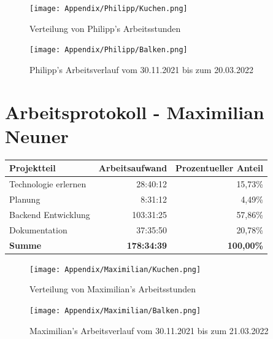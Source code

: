 \begin{figure}[H]
    \begin{center}
        \texttt{[image: Appendix/Philipp/Kuchen.png]}
        \caption{Verteilung von Philipp's Arbeitsstunden}
    \end{center}
\end{figure}

\begin{figure}[H]
    \begin{center}
        \texttt{[image: Appendix/Philipp/Balken.png]}
        \caption{Philipp's Arbeitsverlauf vom 30.11.2021 bis zum 20.03.2022}
    \end{center}
\end{figure}



\newpage

\section*{Arbeitsprotokoll - Maximilian Neuner}

\begin{table}[H]
    \begin{tabular}{lrr}
        \hline
        \textbf{Projektteil} & \textbf{Arbeitsaufwand} & \textbf{Prozentueller Anteil} \\ \hline
        Technologie erlernen & 28:40:12                & 15,73\%                       \\
        Planung              & 8:31:12                 & 4,49\%                        \\
        Backend Entwicklung  & 103:31:25               & 57,86\%                       \\
        Dokumentation        & 37:35:50                & 20,78\%                       \\ \hline
        \textbf{Summe}       & \textbf{178:34:39}      & \textbf{100,00\%}             \\ \hline
    \end{tabular}
\end{table}

\begin{figure}[H]
    \begin{center}
        \texttt{[image: Appendix/Maximilian/Kuchen.png]}
        \caption{Verteilung von Maximilian's Arbeitsstunden}
    \end{center}
\end{figure}

\begin{figure}[H]
    \begin{center}
        \texttt{[image: Appendix/Maximilian/Balken.png]}
        \caption{Maximilian's Arbeitsverlauf vom 30.11.2021 bis zum 21.03.2022}
    \end{center}
\end{figure}
